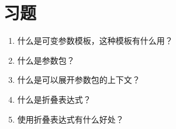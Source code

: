 \section{习题}
\begin{enumerate}
\item
什么是可变参数模板，这种模板有什么用？

\item
什么是参数包？

\item
什么是可以展开参数包的上下文？

\item
什么是折叠表达式？

\item
使用折叠表达式有什么好处？
\end{enumerate}